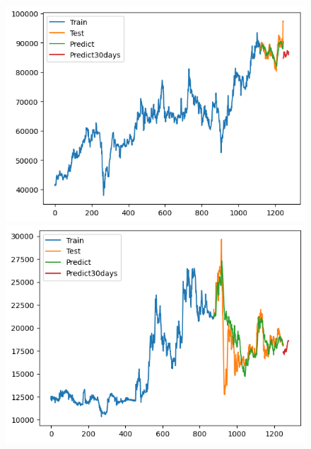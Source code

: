 \begin{figure}[H]
\begin{minipage}{0.15\textwidth}
    \end{minipage}
    \hfill
        \begin{minipage}{0.15\textwidth}
    \centering
    \includegraphics[width=1\textwidth]{resources/chapter-5/result/VCB_NBeats_9-1.png}
    \end{minipage}
    \hfill
    \begin{minipage}{0.15\textwidth}
    \centering
    \includegraphics[width=1\textwidth]{resources/chapter-5/result/EIB_NBeats_7-3.png}
    \end{minipage}
    \hfill
    \begin{minipage}{0.15\textwidth}
    \centering

\end{minipage}
\end{figure}

